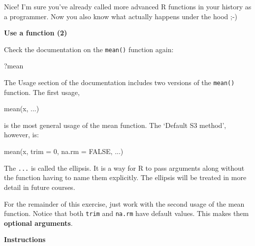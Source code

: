 \documentclass[]{article}
\newcommand{\hlnum}[1]{\textcolor[rgb]{0.816,0.125,0.439}{#1}}%
\newcommand{\hlstd}[1]{\textcolor[rgb]{0.251,0.251,0.251}{#1}}%
\newcommand{\hlkwc}[1]{\textcolor[rgb]{0.251,0.251,0.251}{#1}}%
\newcommand{\hlkwd}[1]{\textcolor[rgb]{0.878,0.439,0.125}{#1}}%
\newenvironment{Shaded}{\begin{myshaded}}{\end{myshaded}}
\newcommand{\KeywordTok}[1]{\hlkwd{#1}}
\newcommand{\DataTypeTok}[1]{\hlkwc{#1}}
\newcommand{\DecValTok}[1]{\hlnum{#1}}
\newcommand{\OtherTok}[1]{{#1}}
\newcommand{\NormalTok}[1]{\hlstd{#1}}
\begin{document}
Nice! I'm sure you've already called more advanced R functions in your
history as a programmer. Now you also know what actually happens under
the hood ;-)

\textbf{Use a function (2)}

Check the documentation on the \texttt{mean()} function again:

\begin{Shaded}
\begin{Highlighting}[]
\NormalTok{?mean}
\end{Highlighting}
\end{Shaded}

The Usage section of the documentation includes two versions of the
\texttt{mean()} function. The first usage,

\begin{Shaded}
\begin{Highlighting}[]
\KeywordTok{mean}\NormalTok{(x, ...)}
\end{Highlighting}
\end{Shaded}

is the most general usage of the mean function. The `Default S3 method',
however, is:

\begin{Shaded}
\begin{Highlighting}[]
\KeywordTok{mean}\NormalTok{(x, }\DataTypeTok{trim =} \DecValTok{0}\NormalTok{, }\DataTypeTok{na.rm =} \OtherTok{FALSE}\NormalTok{, ...)}
\end{Highlighting}
\end{Shaded}

The \texttt{...} is called the ellipsis. It is a way for R to pass
arguments along without the function having to name them explicitly. The
ellipsis will be treated in more detail in future courses.

For the remainder of this exercise, just work with the second usage of
the mean function. Notice that both \texttt{trim} and \texttt{na.rm}
have default values. This makes them \textbf{optional arguments}.

\textbf{Instructions}
\end{document}
